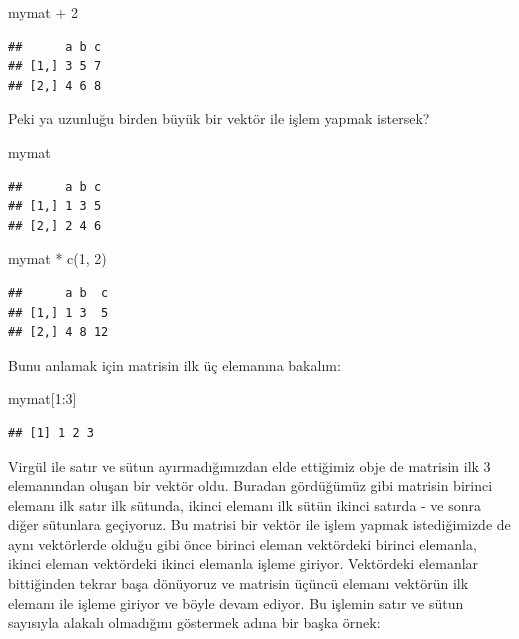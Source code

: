 \documentclass[
]{book}
\newenvironment{Shaded}{\begin{snugshade}}{\end{snugshade}}
\newcommand{\DecValTok}[1]{\textcolor[rgb]{0.00,0.00,0.81}{#1}}
\newcommand{\FunctionTok}[1]{\textcolor[rgb]{0.00,0.00,0.00}{#1}}
\newcommand{\NormalTok}[1]{#1}
\newcommand{\SpecialCharTok}[1]{\textcolor[rgb]{0.00,0.00,0.00}{#1}}
\begin{document}
\begin{Shaded}
\begin{Highlighting}[]
\NormalTok{mymat }\SpecialCharTok{+} \DecValTok{2}
\end{Highlighting}
\end{Shaded}

\begin{verbatim}
##      a b c
## [1,] 3 5 7
## [2,] 4 6 8
\end{verbatim}

Peki ya uzunluğu birden büyük bir vektör ile işlem yapmak istersek?

\begin{Shaded}
\begin{Highlighting}[]
\NormalTok{mymat}
\end{Highlighting}
\end{Shaded}

\begin{verbatim}
##      a b c
## [1,] 1 3 5
## [2,] 2 4 6
\end{verbatim}

\begin{Shaded}
\begin{Highlighting}[]
\NormalTok{mymat }\SpecialCharTok{*} \FunctionTok{c}\NormalTok{(}\DecValTok{1}\NormalTok{, }\DecValTok{2}\NormalTok{)}
\end{Highlighting}
\end{Shaded}

\begin{verbatim}
##      a b  c
## [1,] 1 3  5
## [2,] 4 8 12
\end{verbatim}

Bunu anlamak için matrisin ilk üç elemanına bakalım:

\begin{Shaded}
\begin{Highlighting}[]
\NormalTok{mymat[}\DecValTok{1}\SpecialCharTok{:}\DecValTok{3}\NormalTok{]}
\end{Highlighting}
\end{Shaded}

\begin{verbatim}
## [1] 1 2 3
\end{verbatim}

Virgül ile satır ve sütun ayırmadığımızdan elde ettiğimiz obje de matrisin ilk 3 elemanından oluşan bir vektör oldu. Buradan gördüğümüz gibi matrisin birinci elemanı ilk satır ilk sütunda, ikinci elemanı ilk sütün ikinci satırda - ve sonra diğer sütunlara geçiyoruz. Bu matrisi bir vektör ile işlem yapmak istediğimizde de aynı vektörlerde olduğu gibi önce birinci eleman vektördeki birinci elemanla, ikinci eleman vektördeki ikinci elemanla işleme giriyor. Vektördeki elemanlar bittiğinden tekrar başa dönüyoruz ve matrisin üçüncü elemanı vektörün ilk elemanı ile işleme giriyor ve böyle devam ediyor. Bu işlemin satır ve sütun sayısıyla alakalı olmadığını göstermek adına bir başka örnek:
\end{document}

